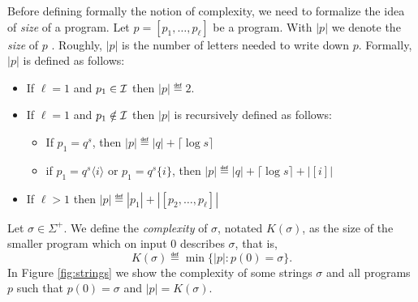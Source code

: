 Before defining formally the notion of complexity, we need to formalize the idea of {\em size} of a program. Let $p=[p_1,\dots,p_\ell]$ be a program.
With $|p|$ we denote the {\em size} of $p$ . Roughly, $|p|$ is the number of letters needed to write down $p$. Formally, $|p|$ is defined as follows:
%
\begin{itemize}
\item If $\ell=1$ and $p_1\in\mathcal{I}$ then $|p|\eqdef 2$.

\item If $\ell=1$ and $p_1\notin\mathcal{I}$ then $|p|$ is recursively defined as follows:
%
	\begin{itemize}
	\item If $p_1=q^s$, then $|p|\eqdef |q|+\lceil \log s\rceil$
	\item if $p_1=q^s\langle i\rangle$ or $p_1=q^s\{ i\}$, then $|p|\eqdef |q|+\lceil \log s\rceil+|[i]|$
	\end{itemize}

\item If $\ell>1$ then $|p|\eqdef |p_1|+|[p_2,\dots, p_\ell]|$
\end{itemize}

Let $\sigma\in\Sigma^+$. We define the {\em complexity} of $\sigma$, notated $K(\sigma)$, as the size of the smaller program which on input $0$ describes $\sigma$, that is,
%
$$
K(\sigma)\eqdef \min\{|p|\colon p(0)=\sigma\}.
$$
In Figure \ref{fig:strings} we show the complexity of some strings $\sigma$ and all programs $p$ such that $p(0)=\sigma$ and $|p|=K(\sigma)$.

